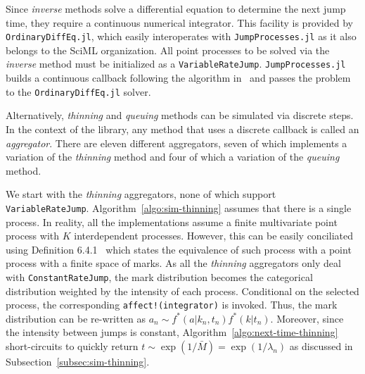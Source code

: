 \documentclass{juliacon}
\begin{document}
Since \textit{inverse} methods solve a differential equation to determine the next jump time, they require a continuous numerical integrator. This facility is provided by \texttt{OrdinaryDiffEq.jl}, which easily interoperates with \texttt{JumpProcesses.jl} as it also belongs to the SciML organization. All point processes to be solved via the \textit{inverse} method must be initialized as a \texttt{VariableRateJump}. \texttt{JumpProcesses.jl} builds a continuous callback following the algorithm in~\cite{salis2005} and passes the problem to the \texttt{OrdinaryDiffEq.jl} solver.

Alternatively, \textit{thinning} and \textit{queuing} methods can be simulated via discrete steps. In the context of the library, any method that uses a discrete callback is called an \textit{aggregator}. There are eleven different aggregators, seven of which implements a variation of the \textit{thinning} method and four of which a variation of the \textit{queuing} method.

We start with the \textit{thinning} aggregators, none of which support \texttt{VariableRateJump}. Algorithm~\ref{algo:sim-thinning} assumes that there is a single process. In reality, all the implementations assume a finite multivariate point process with \( K \) interdependent processes. However, this can be easily conciliated using Definition 6.4.1~\cite{daley2003} which states the equivalence of such process with a point process with a finite space of marks. As all the \textit{thinning} aggregators only deal with \texttt{ConstantRateJump}, the mark distribution becomes the categorical distribution weighted by the intensity of each process. Conditional on the selected process, the corresponding \texttt{affect!(integrator)} is invoked. Thus, the mark distribution can be re-written as \( a_n \sim f^\ast(a | k_n, t_n)  f^\ast(k | t_n) \). Moreover, since the intensity between jumps is constant, Algorithm~\ref{algo:next-time-thinning} short-circuits to quickly return \( t \sim \exp(1 / \bar{M}) = \exp( 1 / \lambda_n ) \) as discussed in Subsection~\ref{subsec:sim-thinning}.
\end{document}
